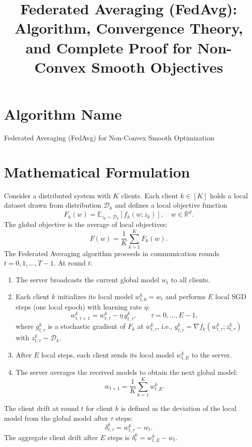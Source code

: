 \documentclass{article}
\title{Federated Averaging (FedAvg): Algorithm, Convergence Theory, and Complete Proof for Non-Convex Smooth Objectives}
\author{}
\date{}
\begin{document}
\maketitle

\section*{Algorithm Name}
Federated Averaging (FedAvg) for Non-Convex Smooth Optimization

\section*{Mathematical Formulation}
Consider a distributed system with $K$ clients. Each client $k \in [K]$ holds a local dataset drawn from distribution $\mathcal{D}_k$ and defines a local objective function
\begin{equation}
    F_k(w) = \mathbb{E}_{z_k \sim \mathcal{D}_k} \left[ f_k(w; z_k) \right], \quad w \in \mathbb{R}^d.
\end{equation}
The global objective is the average of local objectives:
\begin{equation}
    F(w) = \frac{1}{K} \sum_{k=1}^K F_k(w).
\end{equation}
The Federated Averaging algorithm proceeds in communication rounds $t = 0, 1, \dots, T-1$. At round $t$:
\begin{enumerate}
    \item The server broadcasts the current global model $w_t$ to all clients.
    \item Each client $k$ initializes its local model $w_{t,0}^k = w_t$ and performs $E$ local SGD steps (one local epoch) with learning rate $\eta$:
    \begin{equation}
        w_{t,\tau+1}^k = w_{t,\tau}^k - \eta \, g_{t,\tau}^k, \qquad \tau = 0, \dots, E-1,
    \end{equation}
    where $g_{t,\tau}^k$ is a stochastic gradient of $F_k$ at $w_{t,\tau}^k$, i.e., $g_{t,\tau}^k = \nabla f_k(w_{t,\tau}^k; z_{t,\tau}^k)$ with $z_{t,\tau}^k \sim \mathcal{D}_k$.
    \item After $E$ local steps, each client sends its local model $w_{t,E}^k$ to the server.
    \item The server averages the received models to obtain the next global model:
    \begin{equation}
        w_{t+1} = \frac{1}{K} \sum_{k=1}^K w_{t,E}^k.
    \end{equation}
\end{enumerate}
The client drift at round $t$ for client $k$ is defined as the deviation of the local model from the global model after $\tau$ steps:
\begin{equation}
    \delta_{t,\tau}^k = w_{t,\tau}^k - w_t.
\end{equation}
The aggregate client drift after $E$ steps is $\delta_t^k = w_{t,E}^k - w_t$.
\end{document}
